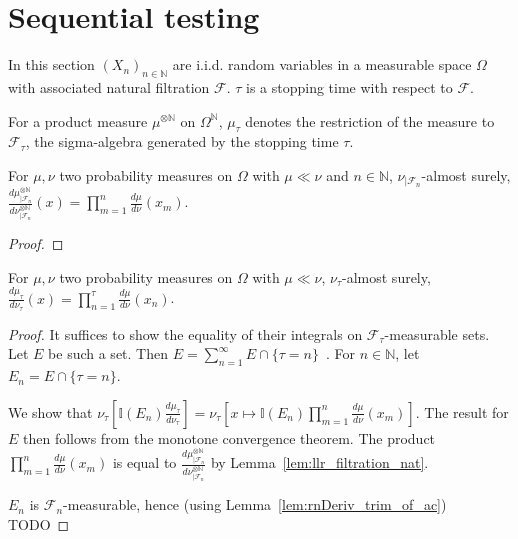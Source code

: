 \section{Sequential testing}

In this section $(X_n)_{n \in \mathbb{N}}$ are i.i.d. random variables in a measurable space $\Omega$ with associated natural filtration $\mathcal F$.
$\tau$ is a stopping time with respect to $\mathcal F$.

For a product measure $\mu^{\otimes \mathbb{N}}$ on $\Omega^{\mathbb{N}}$, $\mu_\tau$ denotes the restriction of the measure to $\mathcal F_\tau$, the sigma-algebra generated by the stopping time $\tau$.

\begin{lemma}
  \label{lem:llr_filtration_nat}
  For $\mu, \nu$ two probability measures on $\Omega$ with $\mu \ll \nu$ and $n \in \mathbb{N}$, $\nu_{| \mathcal F_n}$-almost surely,
  $\frac{d \mu^{\otimes \mathbb{N}}_{| \mathcal F_n}}{d \nu^{\otimes \mathbb{N}}_{| \mathcal F_n}}(x) = \prod_{m=1}^n \frac{d \mu}{d \nu}(x_m)$.
\end{lemma}

\begin{proof}%
\uses{}
\end{proof}

\begin{lemma}
  \label{lem:llr_stopping_time}
  For $\mu, \nu$ two probability measures on $\Omega$ with $\mu \ll \nu$, $\nu_\tau$-almost surely,
  $\frac{d \mu_\tau}{d \nu_\tau}(x) = \prod_{n=1}^\tau \frac{d \mu}{d \nu}(x_n)$.
\end{lemma}

\begin{proof}
It suffices to show the equality of their integrals on $\mathcal F_\tau$-measurable sets. Let $E$ be such a set.
Then $E = \sum_{n=1}^\infty E \cap \{\tau = n\}$~. For $n \in \mathbb{N}$, let $E_n = E \cap \{\tau = n\}$.

We show that $\nu_\tau \left[\mathbb{I}(E_n) \frac{d \mu_\tau}{d \nu_\tau}\right] = \nu_\tau\left[x \mapsto \mathbb{I}(E_n)\prod_{m=1}^n \frac{d \mu}{d \nu}(x_m)\right]$.
The result for $E$ then follows from the monotone convergence theorem.
The product $\prod_{m=1}^n \frac{d \mu}{d \nu}(x_m)$ is equal to $\frac{d \mu^{\otimes \mathbb{N}}_{| \mathcal F_n}}{d \nu^{\otimes \mathbb{N}}_{| \mathcal F_n}}$ by Lemma~\ref{lem:llr_filtration_nat}.

$E_n$ is $\mathcal F_n$-measurable, hence (using Lemma~\ref{lem:rnDeriv_trim_of_ac})
TODO

\end{proof}

